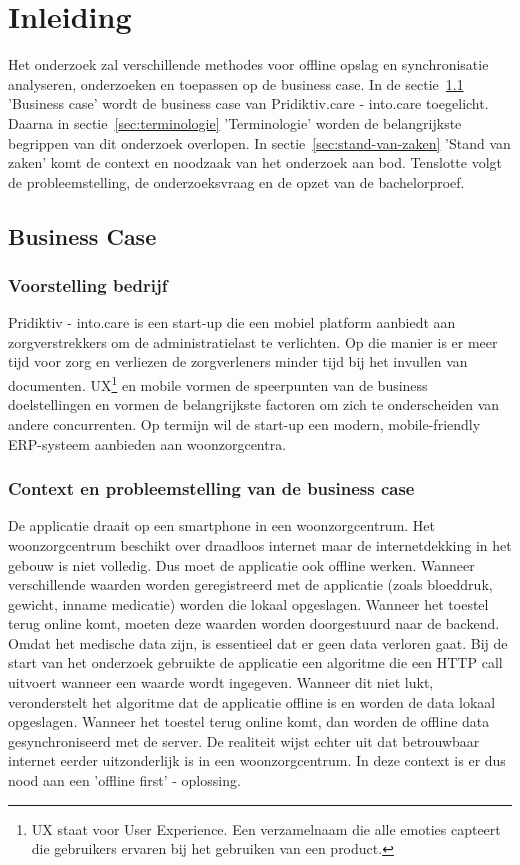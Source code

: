 \chapter{Inleiding}
\label{ch:inleiding}
Het onderzoek zal verschillende methodes voor offline opslag en synchronisatie analyseren, onderzoeken en toepassen op de business case. In de sectie~\ref{sec:business-case} 'Business case' wordt de business case van Pridiktiv.care - into.care toegelicht. Daarna in sectie~\ref{sec:terminologie} 'Terminologie' worden de belangrijkste begrippen van dit onderzoek overlopen. In sectie~\ref{sec:stand-van-zaken} 'Stand van zaken' komt de context en noodzaak van het onderzoek aan bod. Tenslotte volgt de probleemstelling, de onderzoeksvraag en de opzet van de bachelorproef.
\section{Business Case}
\label{sec:business-case}
\subsection{Voorstelling bedrijf}
Pridiktiv - into.care is een start-up die een mobiel platform aanbiedt aan zorgverstrekkers om de administratielast te verlichten. Op die manier is er meer tijd voor zorg en verliezen de zorgverleners minder tijd bij het invullen van documenten. UX\footnote{UX staat voor User Experience. Een verzamelnaam die alle emoties capteert die gebruikers ervaren bij het gebruiken van een product.} en mobile vormen de speerpunten van de business doelstellingen en vormen de belangrijkste factoren om zich te onderscheiden van andere concurrenten. Op termijn wil de start-up een modern, mobile-friendly ERP-systeem aanbieden aan woonzorgcentra.
\clearpage
\subsection{Context en probleemstelling van de business case}
De applicatie draait op een smartphone in een woonzorgcentrum. Het woonzorgcentrum beschikt over draadloos internet maar de internetdekking in het gebouw is niet volledig. Dus moet de applicatie ook offline werken. Wanneer verschillende waarden worden geregistreerd met de applicatie (zoals bloeddruk, gewicht, inname medicatie) worden die lokaal opgeslagen. Wanneer het toestel terug online komt, moeten deze waarden worden doorgestuurd naar de backend. Omdat het medische data zijn, is essentieel dat er geen data verloren gaat. Bij de start van het onderzoek gebruikte de applicatie een algoritme die een HTTP call uitvoert wanneer een waarde wordt ingegeven. Wanneer dit niet lukt, veronderstelt het algoritme dat de applicatie offline is en worden de data lokaal opgeslagen. Wanneer het toestel terug online komt, dan worden de offline data gesynchroniseerd met de server. De realiteit wijst echter uit dat betrouwbaar internet eerder uitzonderlijk is in een woonzorgcentrum. In deze context is er dus nood aan een 'offline first' -  oplossing.
